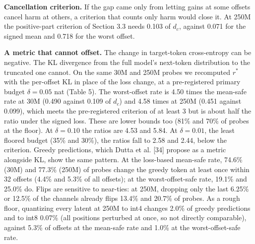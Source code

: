\documentclass[11pt]{article}
\begin{document}
\begin{table}[t]
\centering
\caption{Effect of the horizon at 250M (post hoc): mean suffix-safe rate under the mean ($k=H'$) and worst-offset ($k=1$) criteria using the first $H'$ offsets, with the share of probes whose mean criterion is met at the grid floor. Rows marked * come from the separate $H=128$ run, whose probe positions differ.}
\end{table}

\textbf{Cancellation criterion.} If the gap came only from letting gains at some offsets cancel harm at others, a criterion that counts only harm would close it. At 250M the positive-part criterion of Section 3.3 needs 0.103 of $d_c$, against 0.071 for the signed mean and 0.718 for the worst offset.

\textbf{A metric that cannot offset.} The change in target-token cross-entropy can be negative. The KL divergence from the full model's next-token distribution to the truncated one cannot. On the same 30M and 250M probes we recomputed $r^*$ with the per-offset KL in place of the loss change, at a pre-registered primary budget $\delta=0.05$ nat (Table 5). The worst-offset rate is 4.50 times the mean-safe rate at 30M (0.490 against 0.109 of $d_c$) and 4.58 times at 250M (0.451 against 0.099), which meets the pre-registered criterion of at least 3 but is about half the ratio under the signed loss. These are lower bounds too (81\% and 70\% of probes at the floor). At $\delta=0.10$ the ratios are 4.53 and 5.84. At $\delta=0.01$, the least floored budget (35\% and 30\%), the ratios fall to 2.58 and 2.44, below the criterion. Greedy predictions, which Dutta et al. [34] propose as a metric alongside KL, show the same pattern. At the loss-based mean-safe rate, 74.6\% (30M) and 77.3\% (250M) of probes change the greedy token at least once within 32 offsets (4.4\% and 5.3\% of all offsets); at the worst-offset-safe rate, 19.1\% and 25.0\% do. Flips are sensitive to near-ties: at 250M, dropping only the last 6.25\% or 12.5\% of the channels already flips 13.4\% and 20.7\% of probes. As a rough floor, quantizing every latent at 250M to int4 changes 2.0\% of greedy predictions and to int8 0.07\% (all positions perturbed at once, so not directly comparable), against 5.3\% of offsets at the mean-safe rate and 1.0\% at the worst-offset-safe rate.
\end{document}
